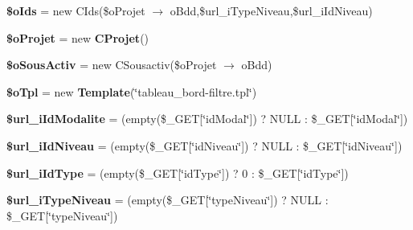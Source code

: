 \begin{CompactItemize}
\item 
\textbf{\$oIds} = new CIds(\$oProjet $\rightarrow$ oBdd,\$url\_\-iTypeNiveau,\$url\_\-iIdNiveau)\label{tableau__bord-filtre_8php_87e9fcad45d9de21f44bfbb0e94f46cd}

\item 
\textbf{\$oProjet} = new {\bf CProjet}()\label{tableau__bord-filtre_8php_ec412e7ac901485e72b77d2185159421}

\item 
\textbf{\$oSousActiv} = new CSousactiv(\$oProjet $\rightarrow$ oBdd)\label{tableau__bord-filtre_8php_d04d9217757b17c226f60c1bb3ac5071}

\item 
\textbf{\$oTpl} = new {\bf Template}(\char`\"{}tableau\_\-bord-filtre.tpl\char`\"{})\label{tableau__bord-filtre_8php_7de57ba665b7c068e98ea46469be2865}

\item 
\textbf{\$url\_\-iIdModalite} = (empty(\$\_\-GET[\char`\"{}idModal\char`\"{}]) ? NULL : \$\_\-GET[\char`\"{}idModal\char`\"{}])\label{tableau__bord-filtre_8php_2edc95399ae9c2596483c664df65e666}

\item 
\textbf{\$url\_\-iIdNiveau} = (empty(\$\_\-GET[\char`\"{}idNiveau\char`\"{}]) ? NULL : \$\_\-GET[\char`\"{}idNiveau\char`\"{}])\label{tableau__bord-filtre_8php_14f74b59a1171eaf2411d94c3c8bf8dd}

\item 
\textbf{\$url\_\-iIdType} = (empty(\$\_\-GET[\char`\"{}idType\char`\"{}]) ? 0 : \$\_\-GET[\char`\"{}idType\char`\"{}])\label{tableau__bord-filtre_8php_7fea7f5b9f2fcee65976df1093b911aa}

\item 
\textbf{\$url\_\-iTypeNiveau} = (empty(\$\_\-GET[\char`\"{}typeNiveau\char`\"{}]) ? NULL : \$\_\-GET[\char`\"{}typeNiveau\char`\"{}])\label{tableau__bord-filtre_8php_526ed781c4213d7b78e267d1eeb0b7e4}

\end{CompactItemize}

